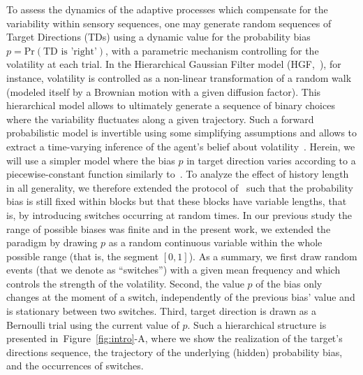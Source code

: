 \documentclass[12pt,english]{article}%
\newcommand{\citep}[1]{\parencite{#1}}
\newcommand{\citet}[1]{\textcite{#1}}
\newcommand{\seeFig}[1]{Figure~\ref{fig:#1}}
\begin{document}
To assess the dynamics of the adaptive processes
which compensate for the variability within sensory sequences,
one may generate random sequences of Target Directions (TDs) 
using a dynamic value for the probability bias $p = \text{Pr}(\text{TD is 'right'})$,
with a parametric mechanism controlling for the volatility at each trial.
In the Hierarchical Gaussian Filter model (HGF,~\citet{Mathys11}), for instance,
volatility is controlled as a non-linear transformation
of a random walk (modeled itself by a Brownian motion with a given diffusion factor).
This hierarchical model allows to ultimately generate a sequence of binary choices
where the variability fluctuates along a given trajectory.
Such a forward probabilistic model is invertible
using some simplifying assumptions and allows
to extract a time-varying inference of the agent's belief about volatility~\citep{Vossel14}.
Herein, we will use a simpler model where
the bias $p$ in target direction varies according to a piecewise-constant function
similarly to~\citet{Meyniel13}.
To analyze the effect of history length in all generality,
we therefore extended the protocol of~\citep{Montagnini2010} such that the probability bias
is still fixed within blocks but that these blocks have variable lengths,
that is, by introducing switches occurring at random times.
In our previous study
the range of possible biases was finite 
and in the present work, we extended the paradigm
by drawing $p$ as a random continuous variable 
within the whole possible range (that is, the segment $[ 0, 1 ]$). 
As a summary, we first draw random events (that we denote as ``switches'')
with a given mean frequency and which controls the strength of the volatility.
Second, the value $p$ of the bias only changes at the moment of a switch,
independently of the previous bias' value
and is stationary between two switches.
Third, target direction is drawn as a Bernoulli trial using the current value of $p$.
Such a hierarchical structure is presented in~\seeFig{intro}-A, 
where we show the realization of the target's directions sequence,
the trajectory of the underlying (hidden) probability bias, and
the occurrences of switches.
\end{document}
